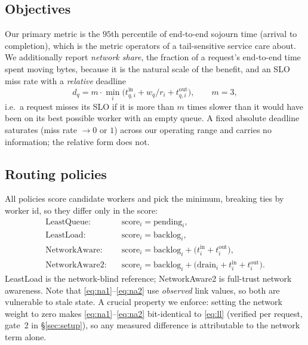 \subsection{Objectives}
Our primary metric is the $95$th percentile of end-to-end sojourn time (arrival to completion),
which is the metric operators of a tail-sensitive service care about. We additionally report
\emph{network share}, the fraction of a request's end-to-end time spent moving bytes, because it
is the natural scale of the benefit, and an SLO miss rate with a \emph{relative} deadline
\begin{equation}
  d_q = m \cdot \min_i \big( t^{\text{in}}_{q,i} + w_q/r_i + t^{\text{out}}_{q,i} \big),
  \qquad m = 3,
  \label{eq:slo}
\end{equation}
i.e.~a request misses its SLO if it is more than $m$ times slower than it would have been on its
best possible worker with an empty queue. A fixed absolute deadline saturates (miss rate $\to
0$ or $1$) across our operating range and carries no information; the relative form does not.

\subsection{Routing policies}
\label{sec:policies}
All policies score candidate workers and pick the minimum, breaking ties by worker id, so they
differ only in the score:
\begin{align}
  \text{LeastQueue:} \quad & \text{score}_i = \text{pending}_i, \label{eq:lq}\\
  \text{LeastLoad:}  \quad & \text{score}_i = \text{backlog}_i, \label{eq:ll}\\
  \text{NetworkAware:} \quad & \text{score}_i = \text{backlog}_i + \big(t^{\text{in}}_i + t^{\text{out}}_i\big), \label{eq:na1}\\
  \text{NetworkAware2:} \quad & \text{score}_i = \text{backlog}_i + \big(\text{drain}_i + t^{\text{in}}_i + t^{\text{out}}_i\big). \label{eq:na2}
\end{align}
LeastLoad is the network-blind reference; NetworkAware2 is full-trust network awareness. Note
that \eqref{eq:na1}--\eqref{eq:na2} use \emph{observed} link values, so both are vulnerable to
stale state. A crucial property we enforce: setting the network weight to zero makes
\eqref{eq:na1}--\eqref{eq:na2} bit-identical to \eqref{eq:ll} (verified per request, gate~2 in
\S\ref{sec:setup}), so any measured difference is attributable to the network term alone.

